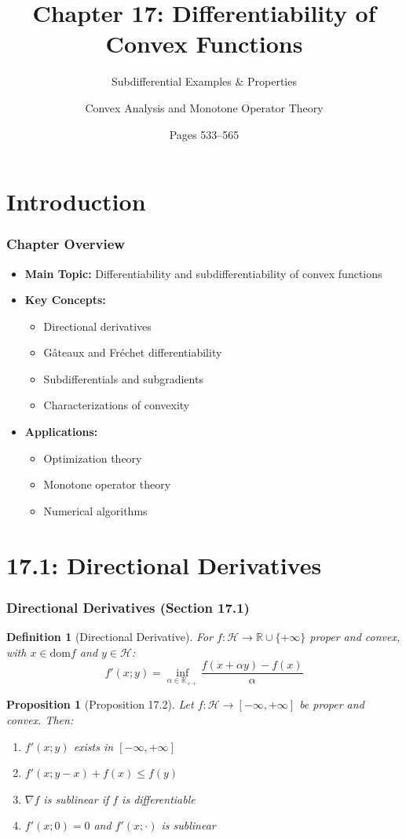 \documentclass[aspectratio=169,10pt]{beamer}
\title{Chapter 17: Differentiability of Convex Functions}
\subtitle{Subdifferential Examples \& Properties}
\author{Convex Analysis and Monotone Operator Theory}
\date{Pages 533--565}
\newtheorem{prop}{Proposition}
\newtheorem{defn}{Definition}
\begin{document}
\frame{\titlepage}

\section{Introduction}
\begin{frame}
  \frametitle{Chapter Overview}
  \begin{itemize}
    \item \textbf{Main Topic:} Differentiability and subdifferentiability of convex functions
    \item \textbf{Key Concepts:}
      \begin{itemize}
        \item Directional derivatives
        \item Gâteaux and Fréchet differentiability
        \item Subdifferentials and subgradients
        \item Characterizations of convexity
      \end{itemize}
    \item \textbf{Applications:}
      \begin{itemize}
        \item Optimization theory
        \item Monotone operator theory
        \item Numerical algorithms
      \end{itemize}
  \end{itemize}
\end{frame}

\section{17.1: Directional Derivatives}
\begin{frame}[fragile]
  \frametitle{Directional Derivatives (Section 17.1)}

  \begin{defn}[Directional Derivative]
    For $f: \mathcal{H} \to \mathbb{R} \cup \{+\infty\}$ proper and convex, with $x \in \text{dom} f$ and $y \in \mathcal{H}$:
    \[
    f'(x;y) = \inf_{\alpha \in \mathbb{R}_{++}} \frac{f(x + \alpha y) - f(x)}{\alpha}
    \]
  \end{defn}

  \begin{prop}[Proposition 17.2]
    Let $f: \mathcal{H} \to [-\infty, +\infty]$ be proper and convex. Then:
    \begin{enumerate}
      \item[(i)] $f'(x; y)$ exists in $[-\infty, +\infty]$
      \item[(ii)] $f'(x; y - x) + f(x) \leq f(y)$
      \item[(iii)] $\nabla f$ is sublinear if $f$ is differentiable
      \item[(iv)] $f'(x; 0) = 0$ and $f'(x; \cdot)$ is sublinear
    \end{enumerate}
  \end{prop}
\end{frame}
\end{document}

